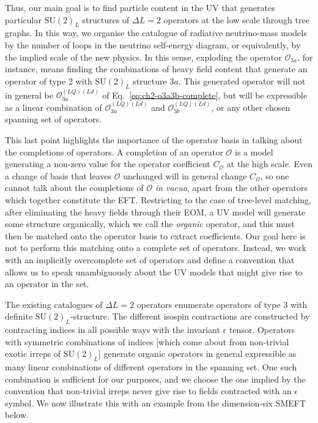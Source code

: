 Thus, our main goal is to find particle content in the UV that generates
particular $\mathrm{SU}(2)_L$ structures of $\Delta L = 2$ operators at the low
scale through tree graphs. In this way, we organise the catalogue of radiative
neutrino-mass models by the number of loops in the neutrino self-energy diagram,
or equivalently, by the implied scale of the new physics. In this sense,
exploding the operator $\mathcal{O}_{3a}$, for instance, means finding the
combinations of heavy field content that generate an operator of type 2 with
$\mathrm{SU}(2)_{L}$ structure $3a$. This generated operator will not in general
be $\mathcal{O}_{3a}^{(LQ)(Ld)}$ of Eq.~\eqref{eq:ch2-o3a3b-complete}, but will be
expressible as a linear combination of $\mathcal{O}_{3a}^{(LQ)(Ld)}$ and
$\mathcal{O}_{3b}^{(LQ)(Ld)}$, or any other chosen spanning set of operators.

This last point highlights the importance of the operator basis in talking about
the completions of operators. A completion of an operator $\mathcal{O}$ is a
model generating a non-zero value for the operator coefficient $C_{\mathcal{O}}$
at the high scale. Even a change of basis that leaves $\mathcal{O}$ unchanged
will in general change $C_{\mathcal{O}}$, so one cannot talk about the
completions of $\mathcal{O}$ \textit{in vacuo}, apart from the other operators
which together constitute the EFT. Restricting to the case of tree-level
matching, after eliminating the heavy fields through their EOM, a UV model will
generate some structure organically, which we call the \textit{organic}
operator, and this must then be matched onto the operator basis to extract
coefficients. Our goal here is not to perform this matching onto a complete set
of operators. Instead, we work with an implicitly overcomplete set of operators
and define a convention that allows us to speak unambiguously about the UV
models that might give rise to an operator in the set.

The existing catalogues of $\Delta L = 2$ operators enumerate operators of type
3 with definite $\mathrm{SU}(2)_{L}$-structure. The different isospin
contractions are constructed by contracting indices in all possible ways with
the invariant $\epsilon$ tensor. Operators with symmetric combinations of
indices [which come about from non-trivial exotic irreps of
$\mathrm{SU}(2)_{L}$] generate organic operators in general expressible as many
linear combinations of different operators in the spanning set. One such
combination is sufficient for our purposes, and we choose the one implied by the
convention that non-trivial irreps never give rise to fields contracted with an
$\epsilon$ symbol. We now illustrate this with an example from the dimension-six
SMEFT below.

